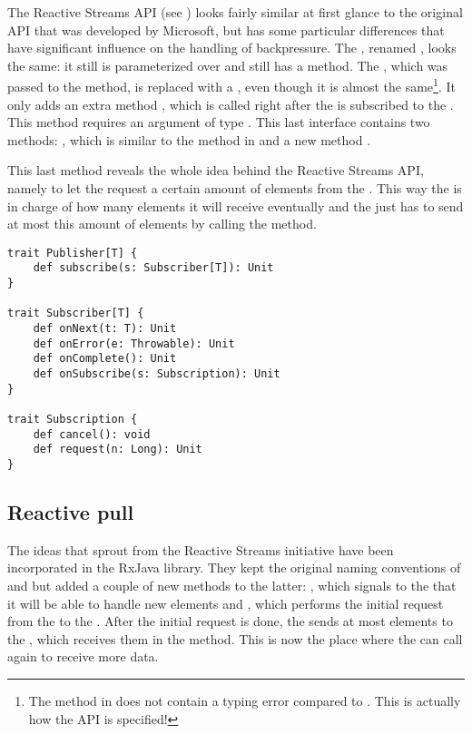 The Reactive Streams API (see ) looks fairly similar at first glance to the original API that was developed by Microsoft, but has some particular differences that have significant influence on the handling of backpressure. The \obs, renamed , looks the same: it still is parameterized over  and still has a  method. The \obv, which was passed to the  method, is replaced with a , even though it is almost the same\footnote{The  method in  does not contain a typing error compared to . This is actually how the API is specified!}. It only adds an extra method , which is called right after the  is subscribed to the . This  method requires an argument of type . This last interface contains two methods: , which is similar to the  method in  and a new method .

This last method reveals the whole idea behind the Reactive Streams API, namely to let the  request a certain amount of elements from the . This way the  is in charge of how many elements it will receive eventually and the  just has to send at most this amount of elements by calling the  method.

\begin{minipage}{\linewidth}
\begin{lstlisting}[style=ScalaStyle, caption={Publisher, Subscriber and Subscription}, label={lst:pub-sub}]
trait Publisher[T] {
    def subscribe(s: Subscriber[T]): Unit
}

trait Subscriber[T] {
    def onNext(t: T): Unit
    def onError(e: Throwable): Unit
    def onComplete(): Unit
    def onSubscribe(s: Subscription): Unit
}

trait Subscription {
    def cancel(): void
    def request(n: Long): Unit
}
\end{lstlisting}
\end{minipage}

\subsection{Reactive pull}
\label{subsec:reactive-pull}
The ideas that sprout from the Reactive Streams initiative have been incorporated in the RxJava library. They kept the original naming conventions of \obs and \obv but added a couple of new methods to the latter: , which signals to the \obs that it will be able to handle  new elements and , which performs the initial request from the \obv to the \obs. After the initial request is done, the \obs sends at most  elements to the \obv, which receives them in the  method. This is now the place where the \obv can call  again to receive more data.


